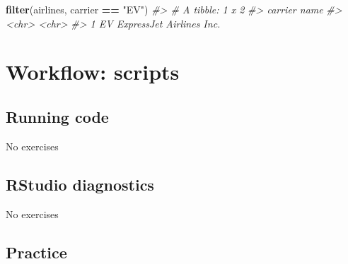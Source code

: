 \documentclass[]{book}
\newenvironment{Shaded}{\begin{snugshade}}{\end{snugshade}}
\newcommand{\CommentTok}[1]{\textcolor[rgb]{0.56,0.35,0.01}{\textit{#1}}}
\newcommand{\DataTypeTok}[1]{\textcolor[rgb]{0.13,0.29,0.53}{#1}}
\newcommand{\KeywordTok}[1]{\textcolor[rgb]{0.13,0.29,0.53}{\textbf{#1}}}
\newcommand{\NormalTok}[1]{#1}
\newcommand{\OperatorTok}[1]{\textcolor[rgb]{0.81,0.36,0.00}{\textbf{#1}}}
\newcommand{\OtherTok}[1]{\textcolor[rgb]{0.56,0.35,0.01}{#1}}
\newcommand{\StringTok}[1]{\textcolor[rgb]{0.31,0.60,0.02}{#1}}
\theoremstyle{definition}
\theoremstyle{definition}
\theoremstyle{definition}
\theoremstyle{remark}
\begin{document}
\begin{Shaded}
\end{Shaded}

\begin{Shaded}
\begin{Highlighting}[]
\KeywordTok{filter}\NormalTok{(airlines, carrier }\OperatorTok{==}\StringTok{ "EV"}\NormalTok{)}
\CommentTok{#> # A tibble: 1 x 2}
\CommentTok{#>   carrier name                    }
\CommentTok{#>   <chr>   <chr>                   }
\CommentTok{#> 1 EV      ExpressJet Airlines Inc.}
\end{Highlighting}
\end{Shaded}

\hypertarget{workflow-scripts}{%
\chapter{Workflow: scripts}\label{workflow-scripts}}

\hypertarget{running-code}{%
\section{Running code}\label{running-code}}

No exercises

\hypertarget{rstudio-diagnostics}{%
\section{RStudio diagnostics}\label{rstudio-diagnostics}}

No exercises

\hypertarget{practice-1}{%
\section{Practice}\label{practice-1}}
\end{document}
